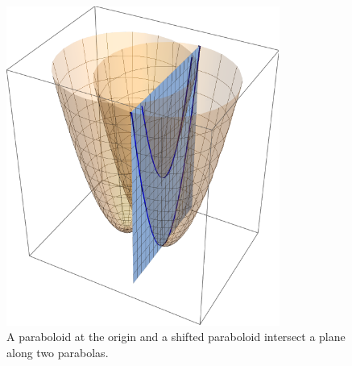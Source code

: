 \documentclass[fleqn]{NotesClass}
\begin{document}
    \begin{figure}
        \includegraphics[width=0.8\textwidth]{images/parabolas-from-parabaloids.pdf}
        \caption[Parabaloids intersect plane to give parabolas.]{A paraboloid at the origin and a shifted paraboloid intersect a plane along two parabolas.}
        \label{fig:parabaloids-intersect-plane}
    \end{figure}
    
\end{document}

